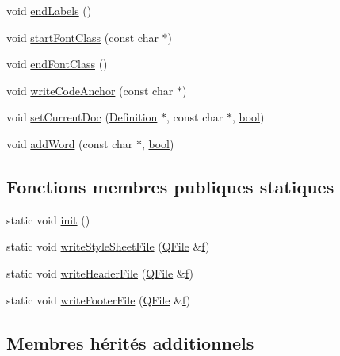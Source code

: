 \begin{DoxyCompactItemize}
\item 
void \hyperlink{class_latex_generator_a5272a911be5eb0d70470fee6c11830bb}{end\+Labels} ()
\item 
void \hyperlink{class_latex_generator_a9d6086d408fbbda70d328c5cbdff56fb}{start\+Font\+Class} (const char $\ast$)
\item 
void \hyperlink{class_latex_generator_a553927a6db74aca325fa50bd666b44b0}{end\+Font\+Class} ()
\item 
void \hyperlink{class_latex_generator_a8f95b3ffc6a7404a308befa3da25b0ef}{write\+Code\+Anchor} (const char $\ast$)
\item 
void \hyperlink{class_latex_generator_af5df048a8317a74877a26dd2a17bac8b}{set\+Current\+Doc} (\hyperlink{class_definition}{Definition} $\ast$, const char $\ast$, \hyperlink{qglobal_8h_a1062901a7428fdd9c7f180f5e01ea056}{bool})
\item 
void \hyperlink{class_latex_generator_a04cf15ca0b9c9a231adbe7e42436a1cf}{add\+Word} (const char $\ast$, \hyperlink{qglobal_8h_a1062901a7428fdd9c7f180f5e01ea056}{bool})
\end{DoxyCompactItemize}
\subsection*{Fonctions membres publiques statiques}
\begin{DoxyCompactItemize}
\item 
static void \hyperlink{class_latex_generator_af9a70007c56adecf1af4b4c29591e423}{init} ()
\item 
static void \hyperlink{class_latex_generator_a7dc6aaf4e1ff04591a0bb8a5e7077925}{write\+Style\+Sheet\+File} (\hyperlink{class_q_file}{Q\+File} \&\hyperlink{060__command__switch_8tcl_af6830d2c644b45088ea8f1f74a46b778}{f})
\item 
static void \hyperlink{class_latex_generator_a2b7ee7973bbc2cb6a8220f2193adddfb}{write\+Header\+File} (\hyperlink{class_q_file}{Q\+File} \&\hyperlink{060__command__switch_8tcl_af6830d2c644b45088ea8f1f74a46b778}{f})
\item 
static void \hyperlink{class_latex_generator_a8971729fb24595de8dee491c0ec7bbc2}{write\+Footer\+File} (\hyperlink{class_q_file}{Q\+File} \&\hyperlink{060__command__switch_8tcl_af6830d2c644b45088ea8f1f74a46b778}{f})
\end{DoxyCompactItemize}
\subsection*{Membres hérités additionnels}



